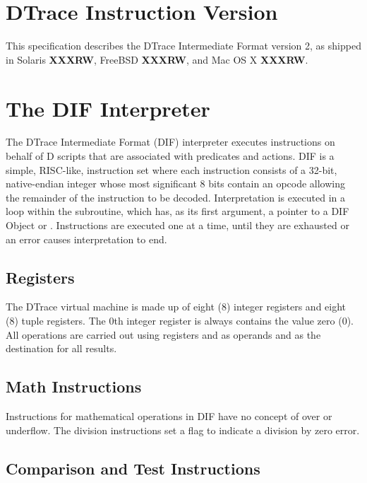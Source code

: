 
\section{DTrace Instruction Version}

This specification describes the DTrace Intermediate Format version 2, as
shipped in Solaris \textbf{XXXRW}, FreeBSD \textbf{XXXRW}, and Mac OS X
\textbf{XXXRW}.

\section{The DIF Interpreter}

The DTrace Intermediate Format (DIF) interpreter executes instructions
on behalf of D scripts that are associated with predicates and
actions.  DIF is a simple, RISC-like, instruction set where each
instruction consists of a 32-bit, native-endian integer whose most
significant 8 bits contain an opcode allowing the remainder of the
instruction to be decoded.  Interpretation is executed in a loop
within the  subroutine, which has, as
its first argument, a pointer to a DIF Object or
.  Instructions are executed one at a time,
until they are exhausted or an error causes interpretation to end.

\subsection{Registers}
\label{sec:dif-registers}

The DTrace virtual machine is made up of eight (8) integer registers
and eight (8) tuple registers.  The 0th integer register is always contains
the value zero (0).  All operations are carried out using registers
 and  as operands and  as
the destination for all results.

\subsection{Math Instructions}
\label{sec:dif-math}

Instructions for mathematical operations in DIF have no concept of
over or underflow.  The division instructions set a flag to indicate a
division by zero error.

\subsection{Comparison and Test Instructions}
\label{sec:dif-cmp-tst}

